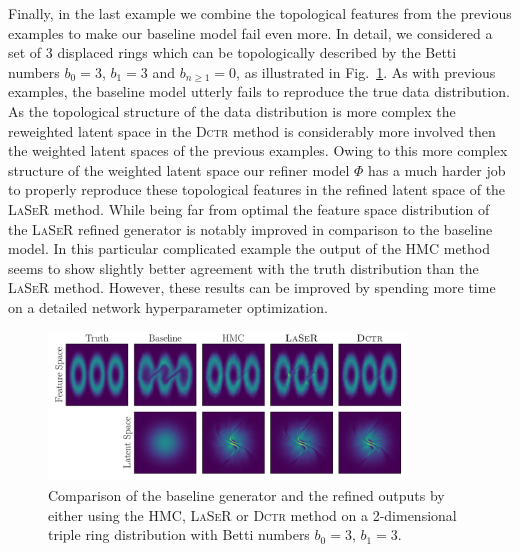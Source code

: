 Finally, in the last example we combine the topological features from the previous examples to make our baseline model fail even more. In detail, we considered a set of 3 displaced rings which can be topologically described by the Betti numbers $b_0=3$, $b_{1}=3$ and $b_{n\ge1}=0$, as illustrated in Fig.~\ref{fig:3_rings}. As with previous examples, the baseline model utterly fails to reproduce the true data distribution. As the topological structure of the data distribution is more complex the reweighted latent space in the \textsc{Dctr} method is considerably more involved then the weighted latent spaces of the previous examples. Owing to this more complex structure of the weighted latent space our refiner model $\Phi$ has a much harder job to properly reproduce these topological features in the refined latent space of the \textsc{LaSeR} method. While being far from optimal the feature space distribution of the \textsc{LaSeR} refined generator is notably improved in comparison to the baseline model. In this particular complicated example the output of the HMC method seems to show slightly better agreement with the truth distribution than the \textsc{LaSeR} method. However, these results can be improved by spending more time on a detailed network hyperparameter optimization.
%
\begin{figure}[!htbp]
    \centering
    \includegraphics[width=0.85\textwidth]{./figures/LSR/3_rings.pdf}
  \caption{Comparison of the baseline generator and the refined outputs by either using the HMC, \textsc{LaSeR} or \textsc{Dctr} method on a 2-dimensional triple ring distribution with Betti numbers $b_0=3$, $b_1=3$.}
  \label{fig:3_rings}
\end{figure}
%
